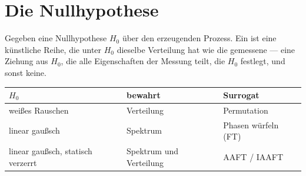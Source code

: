 \section{Die Nullhypothese}

\begin{definition}
Gegeben eine Nullhypothese $H_0$ über den erzeugenden Prozess. Ein  ist eine künstliche Reihe, die unter $H_0$ dieselbe Verteilung hat wie die gemessene --- eine Ziehung aus $H_0$, die alle Eigenschaften der Messung teilt, die $H_0$ festlegt, und sonst keine.

\begin{center}
{\small
\renewcommand{\arraystretch}{1.5}
\begin{tabular}{@{}P{2.2cm}P{3.6cm}P{3.0cm}@{}}
\toprule
$H_0$ & \textbf{bewahrt} & \textbf{Surrogat}\\
\midrule
weißes Rauschen & Verteilung & Permutation\\
linear gaußsch & Spektrum & Phasen würfeln (FT)\\
linear gaußsch, statisch verzerrt & Spektrum und Verteilung & AAFT / IAAFT\\
\bottomrule
\end{tabular}}
\end{center}
\end{definition}

